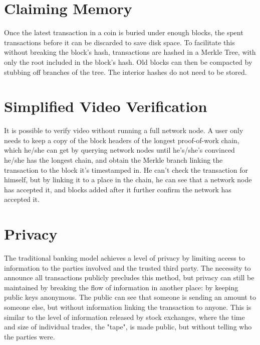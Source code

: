 \section{Claiming Memory}
Once the latest transaction in a coin is buried under enough blocks, the spent transactions before
it can be discarded to save disk space. To facilitate this without breaking the block's hash,
transactions are hashed in a Merkle Tree, with only the root included in the block's hash.
Old blocks can then be compacted by stubbing off branches of the tree. The interior hashes do
not need to be stored.

\section{Simplified Video Verification}
It is possible to verify video without running a full network node. A user only needs to keep
a copy of the block headers of the longest proof-of-work chain, which he/she can get by querying
network nodes until he's/she's convinced he/she has the longest chain, and obtain the Merkle branch
linking the transaction to the block it's timestamped in. He can't check the transaction for
himself, but by linking it to a place in the chain, he can see that a network node has accepted it,
and blocks added after it further confirm the network has accepted it.

\section{Privacy}
The traditional banking model achieves a level of privacy by limiting access to information to the
parties involved and the trusted third party. The necessity to announce all transactions publicly
precludes this method, but privacy can still be maintained by breaking the flow of information in
another place: by keeping public keys anonymous. The public can see that someone is sending
an amount to someone else, but without information linking the transaction to anyone. This is
similar to the level of information released by stock exchanges, where the time and size of
individual trades, the "tape", is made public, but without telling who the parties were.
